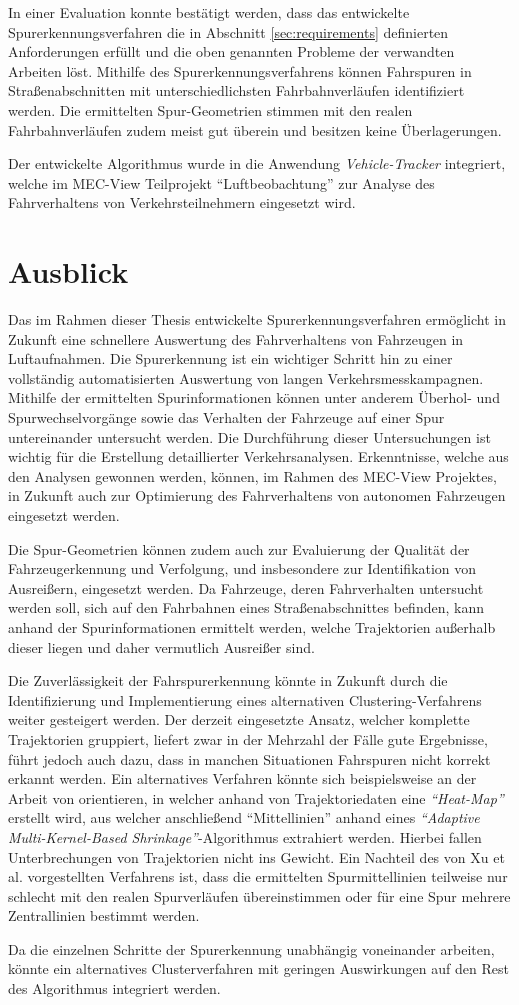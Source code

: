 In einer Evaluation konnte bestätigt werden, dass das entwickelte Spurerkennungsverfahren die in Abschnitt
\ref{sec:requirements} definierten Anforderungen erfüllt und die oben genannten Probleme der verwandten Arbeiten löst.
Mithilfe des Spurerkennungsverfahrens können Fahrspuren in Straßenabschnitten mit unterschiedlichsten
Fahrbahnverläufen identifiziert werden. Die ermittelten Spur-Geometrien stimmen mit den realen Fahrbahnverläufen
zudem meist gut überein und besitzen keine Überlagerungen.

Der entwickelte Algorithmus wurde in die Anwendung \textit{Vehicle-Tracker} integriert,
welche im MEC-View Teilprojekt ``Luftbeobachtung'' zur Analyse des Fahrverhaltens von Verkehrsteilnehmern
eingesetzt wird.

\section{Ausblick}

Das im Rahmen dieser Thesis entwickelte Spurerkennungsverfahren ermöglicht in Zukunft eine schnellere Auswertung
des Fahrverhaltens von Fahrzeugen in Luftaufnahmen. Die Spurerkennung ist ein wichtiger Schritt hin zu einer
vollständig automatisierten Auswertung von langen Verkehrsmesskampagnen.
Mithilfe der ermittelten Spurinformationen können
unter anderem Überhol- und Spurwechselvorgänge sowie das Verhalten der Fahrzeuge auf einer Spur
untereinander untersucht werden. Die Durchführung dieser Untersuchungen ist wichtig für die Erstellung
detaillierter Verkehrsanalysen. Erkenntnisse, welche aus den Analysen gewonnen werden, können, im
Rahmen des MEC-View Projektes, in Zukunft auch zur Optimierung des Fahrverhaltens von autonomen
Fahrzeugen eingesetzt werden.

Die Spur-Geometrien können zudem auch zur Evaluierung der Qualität der Fahrzeugerkennung und Verfolgung,
und insbesondere zur Identifikation von Ausreißern, eingesetzt werden.
Da Fahrzeuge, deren Fahrverhalten untersucht werden soll, sich auf den Fahrbahnen eines Straßenabschnittes befinden,
kann anhand der Spurinformationen ermittelt werden, welche Trajektorien außerhalb dieser liegen und
daher vermutlich Ausreißer sind.

Die Zuverlässigkeit der Fahrspurerkennung könnte in Zukunft durch die Identifizierung und Implementierung
eines alternativen Clustering-Verfahrens weiter gesteigert werden.
Der derzeit eingesetzte Ansatz, welcher komplette Trajektorien gruppiert, liefert zwar in der Mehrzahl der Fälle
gute Ergebnisse, führt jedoch auch dazu, dass in manchen Situationen Fahrspuren nicht korrekt erkannt werden.
Ein alternatives Verfahren könnte sich beispielsweise an der Arbeit von \cite[]{Xu2015} orientieren, in welcher
anhand von Trajektoriedaten eine \textit{``Heat-Map''} erstellt wird, aus welcher anschließend ``Mittellinien''
anhand eines \textit{``Adaptive Multi-Kernel-Based Shrinkage''}-Algorithmus extrahiert werden.
Hierbei fallen Unterbrechungen von Trajektorien nicht ins Gewicht. Ein Nachteil des von Xu et al. vorgestellten
Verfahrens ist, dass die ermittelten Spurmittellinien teilweise nur schlecht mit den realen Spurverläufen
übereinstimmen oder für eine Spur mehrere Zentrallinien bestimmt werden. 

Da die einzelnen Schritte der Spurerkennung unabhängig voneinander arbeiten, könnte ein
alternatives Clusterverfahren mit geringen Auswirkungen auf den Rest des Algorithmus integriert werden.